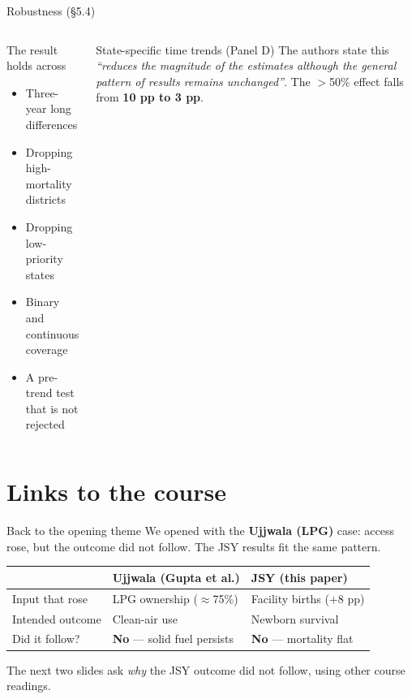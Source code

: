 \documentclass[aspectratio=169,11pt]{beamer}
\newcommand{\kn}[1]{{\color{jsyred}\bfseries #1}}
\begin{document}
\begin{frame}{Robustness (\S5.4)}
  \begin{columns}[T]
    \begin{block}{The result holds across}
      \begin{itemize}
        \item Three-year long differences
        \item Dropping high-mortality districts
        \item Dropping low-priority states
        \item Binary and continuous coverage
        \item A pre-trend test that is not rejected
      \end{itemize}
    \end{block}
    \begin{alertblock}{State-specific time trends (Panel D)}
      {\footnotesize The authors state this \emph{``reduces the magnitude of the estimates although the general pattern of results remains unchanged''}. The $>$50\% effect falls from \kn{10 pp to 3 pp}.}
    \end{alertblock}
  \end{columns}
\end{frame}

\section{Links to the course}
\begin{frame}{Back to the opening theme}
  We opened with the \textbf{Ujjwala (LPG)} case: access rose, but the outcome did not follow. The JSY results fit the same pattern.
  \vspace{0.4em}
  \begin{center}
  \begin{tabular}{lll}
    \toprule
    & \textbf{Ujjwala (Gupta et al.)} & \textbf{JSY (this paper)} \\
    \midrule
    Input that rose & LPG ownership ($\approx$75\%) & Facility births ($+8$ pp) \\
    Intended outcome & Clean-air use & Newborn survival \\
    Did it follow? & \textcolor{jsyred}{\textbf{No}} --- solid fuel persists & \textcolor{jsyred}{\textbf{No}} --- mortality flat \\
    \bottomrule
  \end{tabular}
  \end{center}
  \vspace{0.4em}
  \footnotesize The next two slides ask \emph{why} the JSY outcome did not follow, using other course readings.
\end{frame}
\end{document}
